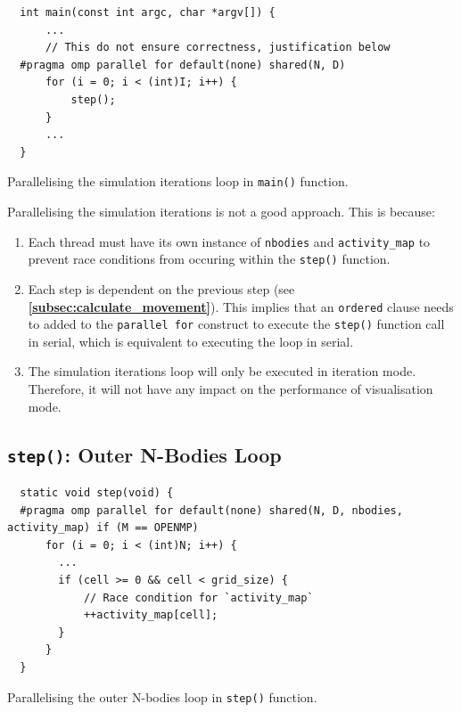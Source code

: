\documentclass[12pt, a4paper]{article}
\let\oldcref\cref
\renewcommand{\cref}[1]{\textbf{\oldcref{#1}}}
\begin{document}
\begin{listing}[H]
  \begin{verbatim}
  int main(const int argc, char *argv[]) {
      ...
      // This do not ensure correctness, justification below
  #pragma omp parallel for default(none) shared(N, D)
      for (i = 0; i < (int)I; i++) {
          step();
      }
      ...
  }
  \end{verbatim}
  \caption{Parallelising the simulation iterations loop in \texttt{main()} function.}
  \label{listing:iter_loop}
\end{listing}

Parallelising the simulation iterations is not a good approach. This is because:
\begin{enumerate}
  \item Each thread must have its own instance of \texttt{nbodies} and \texttt{activity\_map} to
  prevent race conditions from occuring within the \texttt{step()} function.
  \item Each step is dependent on the previous step (see \cref{subsec:calculate_movement}). This
  implies that an \texttt{ordered} clause needs to added to the \texttt{parallel for} construct to
  execute the \texttt{step()} function call  in serial, which is equivalent to executing the loop
  in serial.
  \item The simulation iterations loop will only be executed in iteration mode. Therefore, it will
  not have any impact on the performance of visualisation mode.
\end{enumerate}

\newpage
\subsection{\texttt{step()}: Outer N-Bodies Loop} \label{subsec:nbody_loop}
\begin{listing}[ht]
  \begin{verbatim}
  static void step(void) {
  #pragma omp parallel for default(none) shared(N, D, nbodies, activity_map) if (M == OPENMP)
      for (i = 0; i < (int)N; i++) {
        ...
        if (cell >= 0 && cell < grid_size) {
            // Race condition for `activity_map`
            ++activity_map[cell];
        }
      }
  }
  \end{verbatim}
  \caption{Parallelising the outer N-bodies loop in \texttt{step()} function.}
  \label{listing:nbody_loop}
\end{listing}
\end{document}
